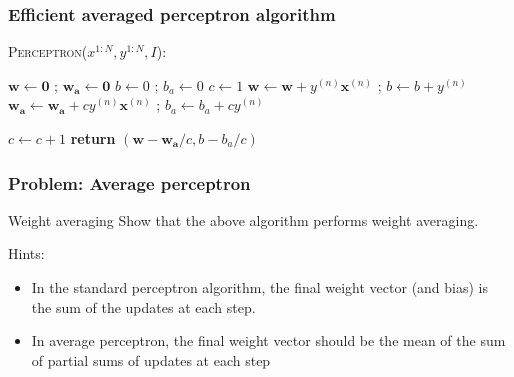 \documentclass{beamer}
\newcommand{\vecb}[1]{\mathbf{#1}}
\newcommand{\x}{\mathbf{x}}
\begin{document}
\begin{frame}
\frametitle{Efficient averaged perceptron algorithm}
 \begin{block}{\textsc{Perceptron}($x^{1:N},y^{1:N},I$):}
\begin{algorithmic}[1]
\STATE $\vecb{w} \leftarrow \vecb{0}$ ; $\vecb{w_a} \leftarrow \vecb{0}$
\STATE $b \leftarrow 0$ ; $b_a \leftarrow 0$
\STATE $c \leftarrow 1$
    		\IF {$y^{(n)} (\vecb{w}\cdot \x^{(n)}+b) \leq 0$}
        		\STATE $\vecb{w} \leftarrow \vecb{w} + y^{(n)} \x^{(n)}$ ; $b \leftarrow b + y^{(n)}$
			\STATE $\vecb{w_a} \leftarrow \vecb{w_a} + c y^{(n)} \x^{(n)}$ ; $b_a \leftarrow b_a + c y^{(n)}$

    		\ENDIF
        \STATE $c \leftarrow c + 1$
    	\ENDFOR
\ENDFOR
\STATE \textbf{return} $(\vecb{w}-\vecb{w_a}/c, b - b_a/c)$
\end{algorithmic}                 \end{block}
\end{frame}


\begin{frame}
\frametitle{Problem: Average perceptron}
\begin{block}{Weight averaging}
Show that the above algorithm performs weight averaging.

Hints:
\begin{itemize}
 \item In the standard perceptron algorithm, the final weight vector (and bias) is the sum of the updates at each step.
\item In average perceptron, the final weight vector should be the mean of the sum of partial sums of updates at each step
\end{itemize}
\end{block}
\end{frame}
\end{document}
